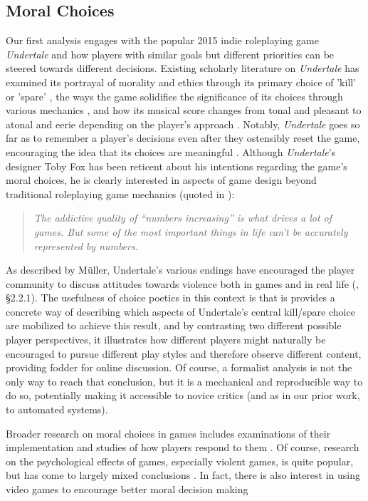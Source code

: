 \documentclass[arts,article,submit,moreauthors,pdftex,10pt,a4paper]{Definitions/mdpi}
\begin{document}
\subsection{Moral Choices}

Our first analysis engages with the popular 2015 indie roleplaying game \emph{Undertale} and how players with similar goals but different priorities can be steered towards different decisions.
%
Existing scholarly literature on \emph{Undertale} has examined its portrayal of morality and ethics through its primary choice of 'kill' or 'spare' \citep{muller2017undertale}, the ways the game solidifies the significance of its choices through various mechanics \citep{day2017agency}, and how its musical score changes from tonal and pleasant to atonal and eerie depending on the player's approach \citep{perez2017undertale}.
%
Notably, \emph{Undertale} goes so far as to remember a player's decisions even after they ostensibly reset the game, encouraging the idea that its choices are meaningful \citep{hughes2015undertale}.
%
Although \emph{Undertale}'s designer Toby Fox has been reticent about his intentions regarding the game's moral choices, he is clearly interested in aspects of game design beyond traditional roleplaying game mechanics (quoted in \cite{feeld2015interview}):

\begin{quote}
  \itshape
The addictive quality of ``numbers increasing'' is what drives a lot of games. But some of the most important things in life can't be accurately represented by numbers.
\end{quote}


As described by Müller, Undertale's various endings have encouraged the player community to discuss attitudes towards violence both in games and in real life (\cite{muller2017undertale}, §2.2.1).
%
The usefulness of choice poetics in this context is that is provides a concrete way of describing which aspects of Undertale's central kill/spare choice are mobilized to achieve this result, and by contrasting two different possible player perspectives, it illustrates how different players might naturally be encouraged to pursue different play styles and therefore observe different content, providing fodder for online discussion.
%
Of course, a formalist analysis is not the only way to reach that conclusion, but it is a mechanical and reproducible way to do so, potentially making it accessible to novice critics (and as in our prior work, to automated systems).


Broader research on moral choices in games includes examinations of their implementation and studies of how players respond to them \citep{svelch2010good,weaver2012mirrored,consalvo2016playing}.
%
Of course, research on the psychological effects of games, especially violent games, is quite popular, but has come to largely mixed conclusions \citep{ferguson2008school,ellithorpe2015moral}.
%
In fact, there is also interest in using video games to encourage better moral decision making \citep{kastarov2017training}
\end{document}
